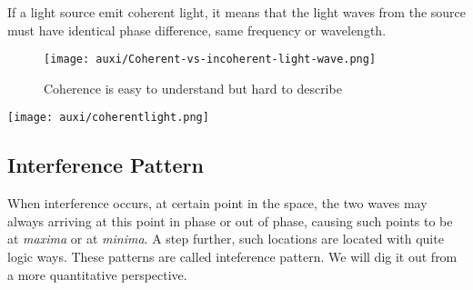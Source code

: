\documentclass[a4paper]{tufte-handout}
\newenvironment{TaskBox} %
{\begin{tcolorbox}[breakable,colback=b1!30,colframe=b1,title=Task]} {\end{tcolorbox}}
\begin{document}
If a light source emit coherent light, it means that the light waves from the source must have identical phase difference, same frequency or wavelength.
\begin{figure}[h]
\centering
\texttt{[image: auxi/Coherent-vs-incoherent-light-wave.png]}
\caption{Coherence is easy to understand but hard to describe}
\end{figure}

\begin{TaskBox}
\texttt{[image: auxi/coherentlight.png]}
\end{TaskBox}


\subsection{Interference Pattern}
When interference occurs, at certain point in the space, the two waves may always arriving at this point in phase or out of phase, causing such points to be at \emph{maxima} or at \emph{minima}. A step further, such locations are located with quite logic ways. These patterns are called inteference pattern. We will dig it out from a more quantitative perspective.
\end{document}
